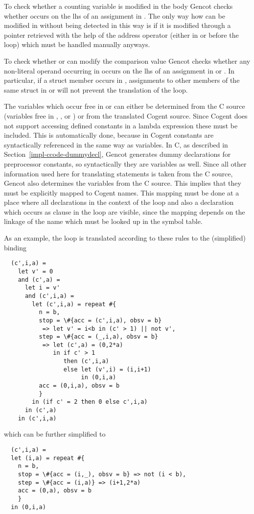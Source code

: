 To check whether a counting variable  is modified in the body  Gencot checks whether  occurs on the lhs
of an assignment in . The only way how  can be modified in  without being detected in this way is if it
is modified through a pointer retrieved with
the help of the address operator \code{\&} (either in  or before the loop) which must be handled manually anyways.

To check whether  or  can modify the comparison value  Gencot checks whether any non-literal operand 
occurring in  occurs on the lhs of an assignment in  or . In particular, if a struct member occurs 
in , assignments to other members of the same struct in  or  will not prevent the translation of the loop.

The variables  which occur free in  or  can either be determined from the C source (variables
free in , , or ) or from the translated Cogent source. Since Cogent does not support accessing defined
constants in a lambda expression these must be included. This is automatically done, because in Cogent constants are syntactically
referenced in the same way as variables. In C, as described in Section~\ref{impl-ccode-dummydecl}, Gencot generates dummy declarations
for preprocessor constants, so syntactically they are variables as well. Since all other information used here for translating 
 statements is taken from the C source, Gencot also determines the variables  from the C source. This implies
that they must be explicitly mapped to Cogent names. This mapping must be done at a place where all declarations in the context
of the loop and also a declaration which occurs as clause  in the loop are visible, since the mapping depends on the 
linkage of the name which must be looked up in the symbol table.

As an example, the loop  is translated according to these rules to the (simplified) binding
\begin{verbatim}
  (c',i,a) = 
    let v' = 0
    and (c',a) = 
      let i = v'
      and (c',i,a) =
        let (c',i,a) = repeat #{
          n = b,
          stop = \#{acc = (c',i,a), obsv = b} 
           => let v' = i<b in (c' > 1) || not v',
          step = \#{acc = (_,i,a), obsv = b} 
           => let (c',a) = (0,2*a)
              in if c' > 1 
                 then (c',i,a)
                 else let (v',i) = (i,i+1)
                      in (0,i,a)
          acc = (0,i,a), obsv = b
          }
        in (if c' = 2 then 0 else c',i,a)
      in (c',a)
    in (c',i,a)
\end{verbatim}
which can be further simplified to
\begin{verbatim}
  (c',i,a) = 
  let (i,a) = repeat #{
    n = b,
    stop = \#{acc = (i,_), obsv = b} => not (i < b),
    step = \#{acc = (i,a)} => (i+1,2*a)
    acc = (0,a), obsv = b
    }
  in (0,i,a)
\end{verbatim}

